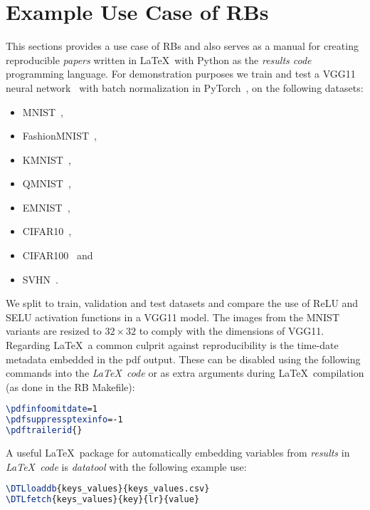\documentclass[journal]{IEEEtran}
\begin{document}
\section{Example Use Case of RBs}
This sections provides a use case of RBs and also serves as a manual for creating reproducible \textit{papers} written in \LaTeX\ with Python as the \textit{results code} programming language.
For demonstration purposes we train and test a VGG11 neural network~\cite{simonyan2014very} with batch normalization in PyTorch~\cite{paszke2019pytorch}, on the following datasets:
\begin{itemize}
	\item MNIST~\cite{lecun2010mnist},
	\item FashionMNIST~\cite{xiao2017fashion},
	\item KMNIST~\cite{clanuwat2018deep},
	\item QMNIST~\cite{yadav2019cold},
	\item EMNIST~\cite{cohen2017emnist},
	\item CIFAR10~\cite{krizhevsky2009learning},
	\item CIFAR100~\cite{krizhevsky2009learning} and
	\item SVHN~\cite{netzer2011reading}.
\end{itemize}

We split to train, validation and test datasets and compare the use of ReLU and SELU activation functions in a VGG11 model.
The images from the MNIST variants are resized to $32\times 32$ to comply with the dimensions of VGG11.
Regarding \LaTeX\ a common culprit against reproducibility is the time-date metadata embedded in the pdf output.
These can be disabled using the following commands into the \textit{\LaTeX\ code} or as extra arguments during \LaTeX\ compilation (as done in the RB Makefile):
\begin{lstlisting}[language=TeX, style=lststyle, caption={\LaTeX\ pdf reproducibility commands.}, captionpos=b]
\pdfinfoomitdate=1
\pdfsuppressptexinfo=-1
\pdftrailerid{}
\end{lstlisting}

A useful \LaTeX\ package for automatically embedding variables from \textit{results} in \textit{\LaTeX\ code} is \textit{datatool} with the following example use:
\begin{lstlisting}[language=TeX, style=lststyle, caption={\LaTeX\ datatool example of loading a file that contains pairs of keys and values (keys\_values.csv) generated by a \textit{results code} and getting the value of a key named lr.}, captionpos=b]
\DTLloaddb{keys_values}{keys_values.csv}
\DTLfetch{keys_values}{key}{lr}{value}
\end{lstlisting}
\end{document}
